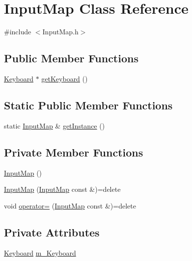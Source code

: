 \hypertarget{class_input_map}{}\section{Input\+Map Class Reference}
\label{class_input_map}


{\ttfamily \#include $<$Input\+Map.\+h$>$}

\subsection*{Public Member Functions}
\begin{DoxyCompactItemize}
\item 
\hyperlink{class_keyboard}{Keyboard} $\ast$ \hyperlink{class_input_map_abce4326eae5855278d5820f8c8be6ddf}{get\+Keyboard} ()
\end{DoxyCompactItemize}
\subsection*{Static Public Member Functions}
\begin{DoxyCompactItemize}
\item 
static \hyperlink{class_input_map}{Input\+Map} \& \hyperlink{class_input_map_ae2eeb0a6d7d6274d8d50f6557a42cbdd}{get\+Instance} ()
\end{DoxyCompactItemize}
\subsection*{Private Member Functions}
\begin{DoxyCompactItemize}
\item 
\hyperlink{class_input_map_aa79c436a267244b2151a564a56ac8b38}{Input\+Map} ()
\item 
\hyperlink{class_input_map_ae7be3f13a088f8c4bc03504a4413317f}{Input\+Map} (\hyperlink{class_input_map}{Input\+Map} const \&)=delete
\item 
void \hyperlink{class_input_map_adfecb2628e99c4a50b4ebf50bf5494fc}{operator=} (\hyperlink{class_input_map}{Input\+Map} const \&)=delete
\end{DoxyCompactItemize}
\subsection*{Private Attributes}
\begin{DoxyCompactItemize}
\item 
\hyperlink{class_keyboard}{Keyboard} \hyperlink{class_input_map_ae1f1c18ccacc60010acc66c2b8d5fe53}{m\+\_\+\+Keyboard}
\end{DoxyCompactItemize}


